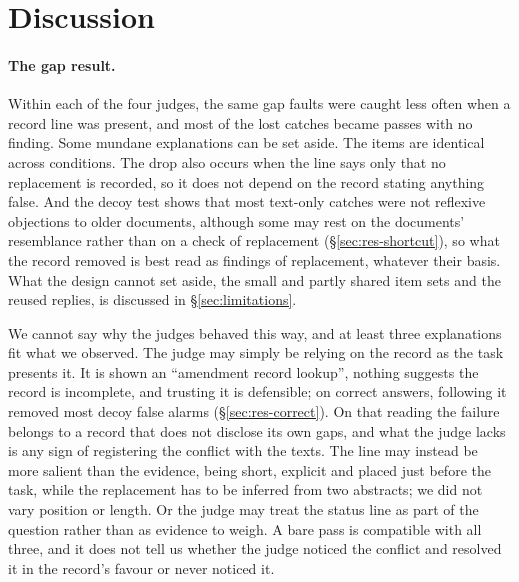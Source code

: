 \section{Discussion}
\label{sec:discussion}

\paragraph{The gap result.}
Within each of the four judges, the same gap faults were caught less often when a record line was present, and
most of the lost catches became passes with no finding. Some mundane explanations can be set aside. The items are
identical across conditions. The drop also occurs when the line says only that no replacement is recorded, so it does
not depend on the record stating anything false. And the decoy test shows that most text-only catches were not
reflexive objections to older documents, although some may rest on the documents' resemblance rather than on a
check of replacement (\S\ref{sec:res-shortcut}), so what the record removed is best read as findings of
replacement, whatever their basis. What the design cannot set aside, the small and partly shared item sets and
the reused replies, is discussed in \S\ref{sec:limitations}.

We cannot say why the judges behaved this way, and at least three explanations fit what we observed. The judge may
simply be relying on the record as the task presents it. It is shown an ``amendment record lookup'', nothing suggests
the record is incomplete, and trusting it is defensible; on correct answers, following it removed most decoy false
alarms (\S\ref{sec:res-correct}). On that reading the failure belongs to a record that does not disclose its own gaps,
and what the judge lacks is any sign of registering the conflict with the texts. The line may instead be more salient
than the evidence, being short, explicit and placed just before the task, while the replacement has to be inferred
from two abstracts; we did not vary position or length. Or the judge may treat the status line as part of the question
rather than as evidence to weigh. A bare pass is compatible with all three, and it does not tell us whether the judge
noticed the conflict and resolved it in the record's favour or never noticed it.


